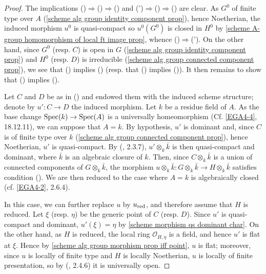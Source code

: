 \begin{proof}
The implications ()$\Rightarrow$()$\Rightarrow$() and (')$\Rightarrow$()$\Rightarrow$() are clear. As $G^0$ of finite type over $A$ (\cref{scheme alg group identity component prop}), hence Noetherian, the induced morphism $u^0$ is quasi-compact so $u^0(G^0)$ is closed in $H^0$ by \cref{scheme A-group homomorphism of local ft image prop}, whence ()$\Rightarrow$('). On the other hand, since $G^0$ (resp. $C$) is open in $G$ (\cref{scheme alg group identity component prop}) and $H^0$ (resp. $D$) is irreducible (\cref{scheme alg group connected component prop}), we see that () implies () (resp. that () implies ()). It then remains to show that () implies ().\par
Let $C$ and $D$ be as in () and endowed them with the induced scheme structure; denote by $u':C\to D$ the induced morphism. Let $k$ be a residue field of $A$. As the base change $\mathrm{Spec}(k)\to\mathrm{Spec}(A)$ is a universally homeomorphism (Cf. \cref{EGA4-4}, 18.12.11), we can suppose that $A=k$. By hypothesis, $u'$ is dominant and, since $C$ is of finite type over $k$ (\cref{scheme alg group connected component prop}), hence Noetherian, $u'$ is quasi-compact. By (\cite{EGA4-2}, 2.3.7), $u'\otimes_k\bar{k}$ is then quasi-compact and dominant, where $\bar{k}$ is an algebraic closure of $k$. Then, since $C\otimes_k\bar{k}$ is a union of connected components of $G\otimes_k\bar{k}$, the morphism $u\otimes_k\bar{k}:G\otimes_k\bar{k}\to H\otimes_k\bar{k}$ satisfies condition (). We are then reduced to the case where $A=k$ is algebraically closed (cf. \cref{EGA4-2}, 2.6.4).\par
In this case, we can further replace $u$ by $u_{\mathrm{red}}$, and therefore assume that $H$ is reduced. Let $\xi$ (resp. $\eta$) be the generic point of $C$ (resp. $D$). Since $u'$ is quasi-compact and dominant, $u'(\xi)=\eta$ by \cref{scheme morphism qs dominant char}. On the other hand, as $H$ is reduced, the local ring $\mathscr{O}_{H,\eta}$ is a field, and hence $u'$ is flat at $\xi$. Hence by \cref{scheme alg group morphism prop iff point}, $u$ is flat; moreover, since $u$ is locally of finite type and $H$ is locally Noetherian, $u$ is locally of finite presentation, so by (\cite{EGA4-2}, 2.4.6) it is universally open.
\end{proof}

